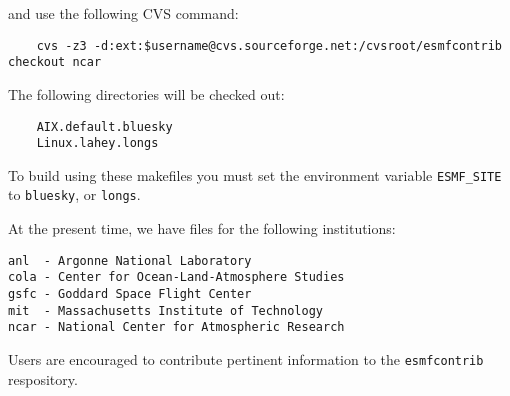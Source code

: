 and use the following CVS command:

\begin{verbatim}
	cvs -z3 -d:ext:$username@cvs.sourceforge.net:/cvsroot/esmfcontrib checkout ncar
\end{verbatim}

The following directories will be checked out:

\begin{verbatim}
	AIX.default.bluesky
	Linux.lahey.longs
\end{verbatim}

To build using these makefiles you must set the environment 
variable {\tt ESMF\_SITE} to {\tt bluesky}, or {\tt longs}.

At the present time, we have files for the following institutions:

\begin{verbatim}
anl  - Argonne National Laboratory
cola - Center for Ocean-Land-Atmosphere Studies
gsfc - Goddard Space Flight Center
mit  - Massachusetts Institute of Technology
ncar - National Center for Atmospheric Research
\end{verbatim}


Users are encouraged to contribute pertinent information to the 
{\tt esmfcontrib} respository.




